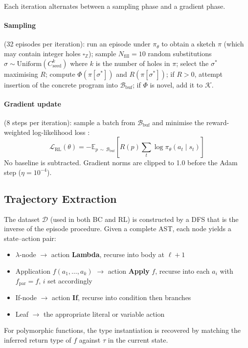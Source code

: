 \documentclass[11pt,a4paper]{article}
\begin{document}
Each iteration alternates between a sampling phase and a gradient phase.

\paragraph{Sampling} (32 episodes per iteration): run an episode under $\pi_\theta$
to obtain a sketch $\pi$ (which may contain integer holes $\square_{\mathbb{Z}}$);
sample $N_{\mathrm{fill}} = 10$ random substitutions
$\sigma \sim \mathrm{Uniform}(C_{\mathrm{seed}}^k)$ where $k$ is the number of holes
in $\pi$; select the $\sigma^*$ maximising $R$; compute $\Phi(\pi[\sigma^*])$ and
$R(\pi[\sigma^*])$; if $R > 0$, attempt insertion of the concrete program into
$\mathcal{B}_{\mathrm{buf}}$; if $\Phi$ is novel, add it to $\mathcal{K}$.

\paragraph{Gradient update} (8 steps per iteration): sample a batch from
$\mathcal{B}_{\mathrm{buf}}$ and minimise the reward-weighted log-likelihood loss
\citep{abolafia2018priority}:
\[
  \mathcal{L}_{\mathrm{RL}}(\theta)
    = -\mathbb{E}_{p\,\sim\,\mathcal{B}_{\mathrm{buf}}}
        \left[ R(p) \sum_{t} \log \pi_\theta(a_t \mid s_t) \right]
\]
No baseline is subtracted. Gradient norms are clipped to 1.0 before the Adam step
($\eta = 10^{-4}$).

\subsection{Trajectory Extraction}\label{sec:trajectory}

The dataset $\mathcal{D}$ (used in both BC and RL) is constructed by a DFS that is the
inverse of the episode procedure. Given a complete AST, each node yields a state--action
pair:
\begin{itemize}
  \item $\lambda$-node $\to$ action \textbf{Lambda}, recurse into body at $\ell + 1$
  \item Application $f(a_1, \ldots, a_k)$ $\to$ action \textbf{Apply} $f$, recurse into
        each $a_i$ with $f_{\mathrm{par}} = f$, $i$ set accordingly
  \item If-node $\to$ action \textbf{If}, recurse into condition then branches
  \item Leaf $\to$ the appropriate literal or variable action
\end{itemize}
For polymorphic functions, the type instantiation is recovered by matching the inferred
return type of $f$ against $\tau$ in the current state.
\end{document}
